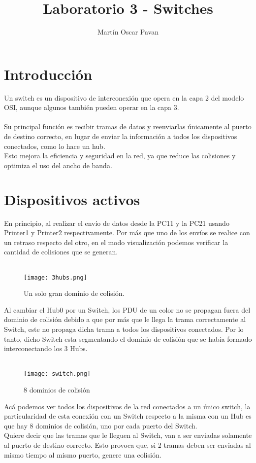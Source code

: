 \documentclass{article}
\title{Laboratorio 3 - Switches}
\author{Martín Oscar Pavan}
\begin{document}
\maketitle

\section{Introducción}
Un switch es un dispositivo de interconexión que opera en la capa 2 del modelo OSI, aunque algunos también pueden operar en la capa 3.
\\\\
Su principal función es recibir tramas de datos y reenviarlas únicamente al puerto de destino correcto, en lugar de enviar la información a todos los dispositivos conectados, como lo hace un hub.
\\
Esto mejora la eficiencia y seguridad en la red, ya que reduce las colisiones y optimiza el uso del ancho de banda.

\section{Dispositivos activos}
En principio, al realizar el envío de datos desde la PC11 y la PC21 usando Printer1 y Printer2 respectivamente. Por más que uno de los envíos se realice con un retraso respecto del otro, en el modo visualización podemos verificar la cantidad de colisiones que se generan.
\\\\
\begin{figure}[H]
\centering
\texttt{[image: 3hubs.png]}
\caption{\label{fig:3pcserver} Un solo gran dominio de colisión.}
\end{figure}

Al cambiar el Hub0 por un Switch, los PDU de un color no se propagan fuera del dominio de colisión debido a que por más que le llega la trama correctamente al Switch, este no propaga dicha trama a todos los dispositivos conectados. Por lo tanto, dicho Switch esta segmentando el dominio de colisión que se había formado interconectando los 3 Hubs.
\\\\
\begin{figure}[H]
\centering
\texttt{[image: switch.png]}
\caption{\label{fig:3pcserver} 8 dominios de colisión}
\end{figure}

Acá podemos ver todos los dispositivos de la red conectados a un único switch, la particularidad de esta conexión con un Switch respecto a la misma con un Hub es que hay 8 dominios de colisión, uno por cada puerto del Switch. \\  
Quiere decir que las tramas que le lleguen al Switch, van a ser enviadas solamente al puerto de destino correcto. Esto provoca que, si 2 tramas deben ser enviadas al mismo tiempo al mismo puerto, genere una colisión.
\end{document}
